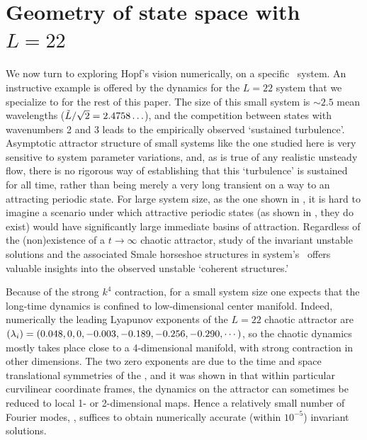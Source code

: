 
\section{Geometry of state space with $L=22$}
\label{sec:L22}

We now turn to exploring Hopf's vision
numerically, on a specific \KS\ system.
An instructive example is offered by the dynamics for
the  $L=22$  system
that we specialize to for the rest of this paper.
The size of this
small system is $\sim 2.5$ mean wavelengths
($\tilde{L}/\sqrt{2}= 2.4758\ldots$),
and the competition between states with wavenumbers 2 and 3
leads to the empirically observed `sustained turbulence'.
Asymptotic attractor structure of small systems like
the one studied here
is very sensitive to system parameter variations, and,
as is true of
any realistic unsteady flow, there is no rigorous way of
establishing that this `turbulence' is sustained for all time,
rather than being
merely a very long transient on a way to an
attracting periodic state.
For large system size, as the one shown in , it is
hard to imagine a scenario under which attractive periodic states
(as shown in , they do exist) would have significantly
large immediate basins of attraction.
Regardless of the
(non)existence of a $t \to \infty$ chaotic attractor, study
of the invariant unstable solutions and the associated Smale
horseshoe structures in system's \statesp\ offers valuable
insights into the observed unstable `coherent structures.'

Because of the strong $k^4$ contraction, for a small system size
one expects that the long-time dynamics is confined to low-dimensional
center manifold. Indeed, numerically the leading Lyapunov exponents of the
$L=22$ chaotic attractor are
$(\lambda_i) = (0.048, 0, 0, -0.003, -0.189, -0.256, -0.290, \cdots)$,
so the chaotic dynamics mostly takes
place close to a 4-dimensional manifold, with strong
contraction in other dimensions.  The two zero exponents
are due to the
time and space translational symmetries of the \KSe,
and it was shown in 
that within particular curvilinear coordinate frames, the
dynamics on the attractor can sometimes be reduced to
local 1- or 2-dimensional maps.
Hence a relatively small
number of Fourier modes, , 
suffices to obtain
numerically accurate (within $10^{-5}$) invariant
solutions.

